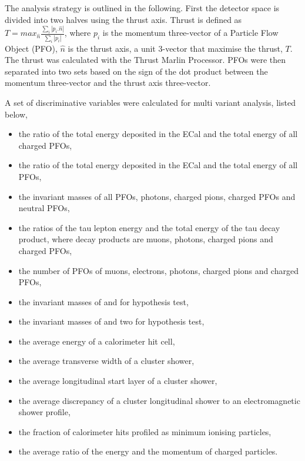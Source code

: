 \documentclass[a4paper,11pt]{article}
\begin{document}
The analysis strategy is outlined in the following. First the detector space is divided into two halves using the thrust axis. Thrust is defined as 
$T = max_{\hat{n}} \frac {\sum_i \left| p_i . \hat{n} \right|}{\sum_i \left| p_i \right|}$, where  $p_i$ is the momentum three-vector of a Particle Flow Object (PFO), $\hat{n}$ is the thrust axis, a unit 3-vector that maximise the thrust, $T$. The thrust was calculated with the Thrust Marlin Processor. PFOs were then separated into two sets based on the sign of the dot product between the momentum three-vector and the thrust axis three-vector.



A set of discriminative variables were calculated for multi variant analysis, listed below, 

\begin{itemize}
  \item the ratio of the total energy deposited in the ECal and the total energy of all charged PFOs,
  \item the ratio of the total energy deposited in the ECal and the total energy of all PFOs,
  \item the invariant masses of all PFOs, photons, charged pions, charged PFOs and neutral PFOs,
  \item the ratios of the tau lepton energy and the total energy of the tau decay product, where decay products are muons, photons, charged pions and charged PFOs,
  \item the number of PFOs of muons, electrons, photons, charged pions and charged PFOs,
  \item the invariant masses of \Prhominus and \Ppizero for \Prhominus hypothesis test,
  \item the invariant masses of \Pai and two \Ppizero for \Ppizero hypothesis test,
  \item the average energy of a calorimeter hit cell,
  \item the average transverse width of a cluster shower,
  \item the average longitudinal start layer of a cluster shower,
  \item the average discrepancy of a  cluster longitudinal shower to an electromagnetic shower profile,
  \item the fraction of calorimeter hits profiled as minimum ionising particles, 
  \item the average ratio of the energy and the momentum of charged particles.
\end{itemize}
\end{document}
